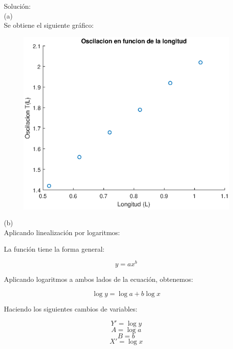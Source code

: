 \documentclass[letter,11pt]{article}
\begin{document}
\begin{enumerate}
    Solución: \\
    (a) \\

    Se obtiene el siguiente gráfico:

    \begin{figure}[!h]
    \centering
    \includegraphics[scale=0.75]{resources/g2a.eps}
    \end{figure}

    (b) \\

    Aplicando linealización por logaritmos:

    La función tiene la forma general:

    \begin{equation*}
        y = a x^b
    \end{equation*}

    Aplicando logaritmos a ambos lados de la ecuación, obtenemos:

    \begin{equation*}
        \log y = \log a + b \log x
    \end{equation*}

    Haciendo los siguientes cambios de variables:

    \begin{equation*}
        Y' = \log y
    \end{equation*}
    \begin{equation*}
        A = \log a
    \end{equation*}
    \begin{equation*}
        B = b
    \end{equation*}
    \begin{equation*}
        X' = \log x
    \end{equation*}


\end{enumerate}
\end{document}
